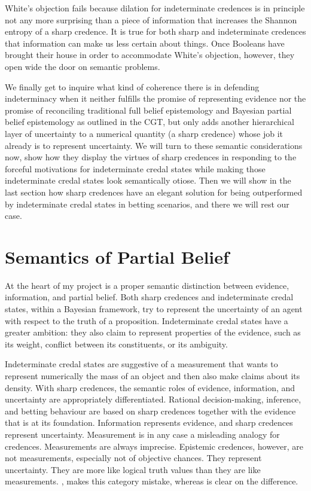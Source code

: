 White's objection fails because dilation for
indeterminate credences is in principle not any more
surprising than a piece of information that increases
the Shannon entropy of a sharp credence. It is true for
both sharp and indeterminate credences that information
can make us less certain about things. Once Booleans
have brought their house in order to accommodate
White's objection, however, they open wide the door on
semantic problems. 

We finally get to inquire what kind of coherence there
is in defending indeterminacy when it neither fulfills
the promise of representing evidence nor the promise of
reconciling traditional full belief 
epistemology and Bayesian partial belief epistemology
as outlined in the CGT, but only adds another
hierarchical layer of uncertainty to a numerical
quantity (a sharp credence) whose job it already is to
represent uncertainty. We will turn to these semantic
considerations now, show how they display the virtues
of sharp credences in responding to the forceful
motivations for indeterminate credal states while
making those indeterminate credal states look
semantically otiose. Then we will show in the last
section how sharp credences have an elegant solution
for being outperformed by indeterminate credal states
in betting scenarios, and there we will rest our case.

\section{Semantics of Partial Belief}
\label{SemanticsOfPartialBelief}

At the heart of my project is a proper semantic
distinction between evidence, information, and partial
belief. Both sharp credences and indeterminate credal
states, within a Bayesian framework, try to represent
the uncertainty of an agent with respect to the truth
of a proposition. Indeterminate credal states have a
greater ambition: they also claim to represent
properties of the evidence, such as its weight,
conflict between its constituents, or its ambiguity.

Indeterminate credal states are suggestive of a
measurement that wants to represent numerically the
mass of an object and then also make claims about its
density. With sharp credences, the semantic roles of
evidence, information, and uncertainty are
appropriately differentiated. Rational decision-making,
inference, and betting behaviour are based on sharp
credences together with the evidence that is at its
foundation. Information represents evidence, and sharp
credences represent uncertainty. Measurement is in any
case a misleading analogy for credences. Measurements
are always imprecise. Epistemic credences, however, are
not measurements, especially not of objective chances.
They represent uncertainty. They are more like logical
truth values than they are like measurements.
, makes this category mistake,
whereas  is clear on the
difference.

